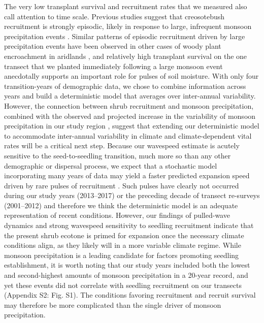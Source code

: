 \documentclass[11pt]{article}\usepackage[]{graphicx}\usepackage[usenames,dvipsnames]{xcolor}
\begin{document}
The very low transplant survival and recruitment rates that we measured also call attention to time scale. 
Previous studies suggest that creosotebush recruitment is strongly episodic, likely in response to large, infrequent monsoon precipitation events \citep{moreno2016seed,allen2008allometry,boyd1983postdispersal}.
Similar patterns of episodic recruitment driven by large precipitation events have been observed in other cases of woody plant encroachment in aridlands \citep{harrington1991effects,weber2022woody}, and relatively high transplant survival on the one transect that we planted immediately following a large monsoon event anecdotally supports an important role for pulses of soil moisture. 
With only four transition-years of demographic data, we chose to combine information across years and build a deterministic model that averages over inter-annual variability.
However, the connection between shrub recruitment and monsoon precipitation, combined with the observed and projected increase in the variability of monsoon precipitation in our study region \citep{petrie2014regional,rudgers2018climate}, suggest that extending our deterministic model to accommodate inter-annual variability in climate and climate-dependent vital rates will be a critical next step. 
Because our wavespeed estimate is acutely sensitive to the seed-to-seedling transition, much more so than any other demographic or dispersal process, we expect that a stochastic model incorporating many years of data may yield a faster predicted expansion speed driven by rare pulses of recruitment \citep{ellner2012temporally}. 
Such pulses have clearly not occurred during our study years (2013--2017) or the preceding decade of transect re-surveys (2001--2012) and therefore we think the deterministic model is an adequate representation of recent conditions. 
However, our findings of pulled-wave dynamics and strong wavespeed sensitivity to seedling recruitment indicate that the present shrub ecotone is primed for expansion once the necessary climate conditions align, as they likely will in a more variable climate regime.
While monsoon precipitation is a leading candidate for factors promoting seedling establishment, it is worth noting that our study years included both the lowest and second-highest amounts of monsoon precipitation in a 20-year record, and yet these events did not correlate with seedling recruitment on our transects (Appendix S2: Fig. S1). 
The conditions favoring recruitment and recruit survival may therefore be more complicated than the single driver of monsoon precipitation. 
\end{document}
